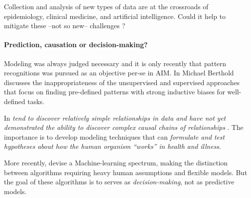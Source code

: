 \documentclass[french,12pt,twoside,a4paper]{book}
\begin{document}
Collection and analysis of new types of data are at the crossroads of
epidemiology, clinical medicine, and artificial intelligence. Could it help to
mitigate these --not so new-- challenges ?

\paragraph{Prediction, causation or decision-making?}

Modeling was always judged necessary and it is only recently that pattern
recognitions was pursued as an objective per-se in AIM.
In \citep{patel2009coming} Michael Berthold discusses the inappropriateness of the
unsupervised and supervised approaches that focus on finding pre-defined
patterns with strong inductive biases for well-defined tasks.

In \cite{patel2009coming} \textit{tend to discover relatively simple
  relationships in data and have not yet demonstrated the ability to discover
  complex causal chains of relationships }. The importance is to develop modeling
techniques that can \textit{formulate and test hypotheses about how the human
  organism “works” in health and illness}.

More recently, \cite{beam2018big} devise a Machine-learning spectrum, making
the distinction between algorithms requiring heavy human assumptions and
flexible models. But the goal of these algorithms is to serves as
\textit{decision-making}, not as predictive models.
\end{document}

